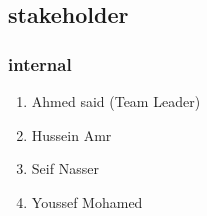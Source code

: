 \documentclass[12pt]{article}
\begin{document}


\subsection{stakeholder}
\subsubsection{internal}
\begin{enumerate}
\item Ahmed said (Team Leader)
\item Hussein Amr
\item Seif Nasser
\item Youssef Mohamed

\end{enumerate}
\end{document}
